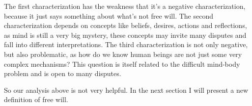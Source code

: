 The first characterization has the weakness that it’s a negative characterization, because it just says something about what’s not free will. The second characterization depends on concepts like beliefs, desires, actions and reflections, as mind is still a very big mystery, these concepts may invite many disputes and fall into different interpretations. The third characterization is not only negative, but also problematic, as how do we know human beings are not just some very complex mechanisms? This question is itself related to the difficult mind-body problem and is open to many disputes.

So our analysis above is not very helpful. In the next section I will present a new definition of free will.
